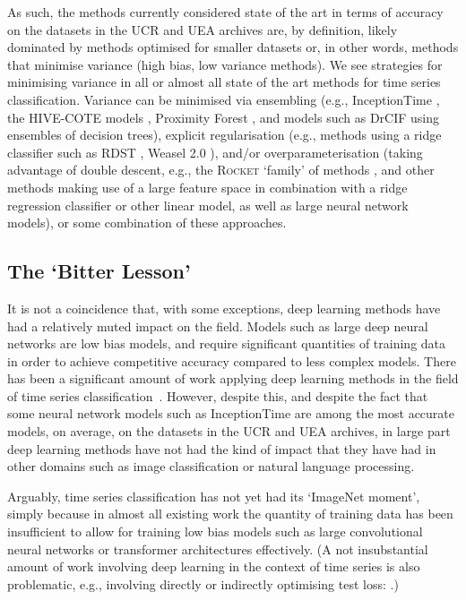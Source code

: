 \documentclass[twoside,11pt,preprint]{article}
\newcommand{\rocket}{\textsc{Rocket}}
\begin{document}
As such, the methods currently considered state of the art in terms of accuracy on the datasets in the UCR and UEA archives are, by definition, likely dominated by methods optimised for smaller datasets or, in other words, methods that minimise variance (high bias, low variance methods). We see strategies for minimising variance in all or almost all state of the art methods for time series classification. Variance can be minimised via ensembling (e.g., InceptionTime \citep{Fawaz2019a}, the HIVE-COTE models \citep{middlehurst_etal_2021}, Proximity Forest \citep{lucas_etal_2019}, and models such as DrCIF \citep{middlehurst_etal_2021}  using ensembles of decision trees), explicit regularisation (e.g., methods using a ridge classifier such as RDST \citep{guillaume_etal_2022}, Weasel 2.0 \citep{schaefer_etal_2023}), and/or overparameterisation (taking advantage of double descent, e.g., the {\rocket} `family' of methods \citep{dempster_etal_2020,dempster_etal_2021,dempster_etal_2023}, and other methods making use of a large feature space in combination with a ridge regression classifier or other linear model, as well as large neural network models), or some combination of these approaches.

\subsection{The `Bitter Lesson'}

It is not a coincidence that, with some exceptions, deep learning methods have had a relatively muted impact on the field. Models such as large deep neural networks are low bias models, and require significant quantities of training data in order to achieve competitive accuracy compared to less complex models. There has been a significant amount of work applying deep learning methods in the field of time series classification~\citep{navid2024}. However, despite this, and despite the fact that some neural network models such as InceptionTime \citep{Fawaz2019a} are among the most accurate models, on average, on the datasets in the UCR and UEA archives, in large part deep learning methods have not had the kind of impact that they have had in other domains such as image classification or natural language processing.

Arguably, time series classification has not yet had its `ImageNet moment', simply because in almost all existing work the quantity of training data has been insufficient to allow for training low bias models such as large convolutional neural networks or transformer architectures effectively. (A not insubstantial amount of work involving deep learning in the context of time series is also problematic, e.g., involving directly or indirectly optimising test loss: \citet{middlehurst_etal_2024}.)
\end{document}
